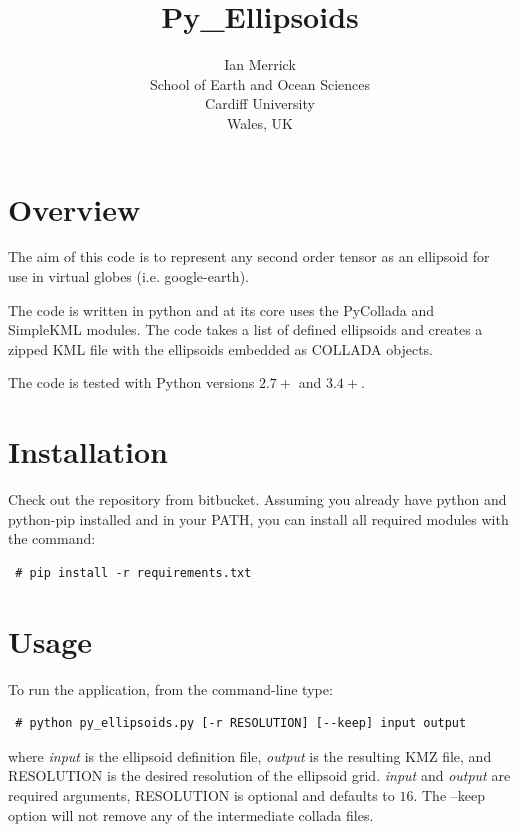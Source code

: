 \documentclass[11pt]{article}
\title{\textbf{Py\_Ellipsoids}}
\author{Ian Merrick\\
		School of Earth and Ocean Sciences\\
		Cardiff University\\
		Wales, UK}
\date{}
\begin{document}
\maketitle

\section{Overview}
The aim of this code is to represent any second order tensor as an ellipsoid for use in virtual globes (i.e. google-earth).

The code is written in python and at its core uses the PyCollada\cite{pycollada} and SimpleKML\cite{simplekml} modules. The code takes a list of defined ellipsoids and creates a zipped KML\cite{kml} file with the ellipsoids embedded as COLLADA\cite{collada} objects.

The code is tested with Python versions $2.7+$ and $3.4+$.

\section{Installation}
Check out the repository from bitbucket\cite{repo}. Assuming you already have python and python-pip installed and in your PATH, you can install all required modules with the command:
\begin{verbatim}
 # pip install -r requirements.txt
\end{verbatim}

\section{Usage}
To run the application, from the command-line type:
\begin{verbatim}
 # python py_ellipsoids.py [-r RESOLUTION] [--keep] input output
\end{verbatim}
where {\em input} is the ellipsoid definition file, {\em output} is the resulting KMZ file, and {\footnotesize RESOLUTION} is the desired resolution of the ellipsoid grid. {\em input} and {\em output} are required arguments, {\footnotesize RESOLUTION} is optional and defaults to $16$. The {\small --keep} option will not remove any of the intermediate collada files.
\end{document}
